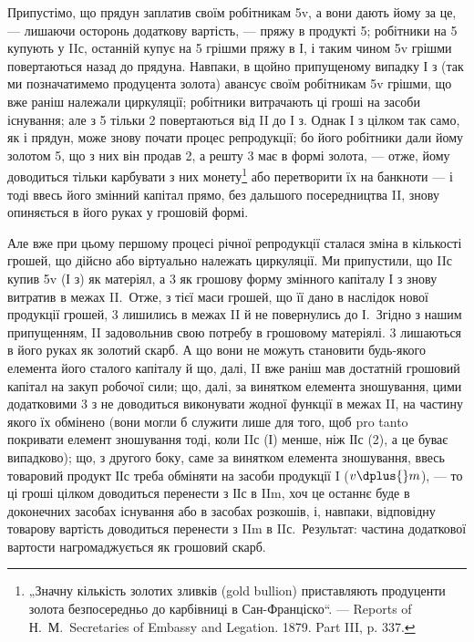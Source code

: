 Припустімо, що прядун заплатив своїм робітникам 5v, а вони дають
йому за це, — лишаючи осторонь додаткову вартість, — пряжу в продукті \deq{} 5;
робітники на 5 купують у IIс, останній купує на 5 грішми пряжу в І, і
таким чином 5v грішми повертаються назад до прядуна. Навпаки, в
щойно припущеному випадку І з (так ми позначатимемо продуцента
золота) авансує своїм робітникам 5v грішми, що вже раніш належали
циркуляції; робітники витрачають ці гроші на засоби існування; але з
5 тільки 2 повертаються від II до І з. Однак І з цілком так само, як і
прядун, може знову почати процес репродукції; бо його робітники дали
йому золотом 5, що з них він продав 2, а решту 3 має в формі золота, —
отже, йому доводиться тільки карбувати з них монету\footnote{
„Значну кількість золотих зливків (gold bullion) приставляють продуценти
золота безпосередньо до карбівниці в Сан-Франціско“. — Reports of Н.~М.~Secretaries
of Embassy and Legation. 1879. Part III, p. 337.
} або перетворити
їх на банкноти — і тоді ввесь його змінний капітал прямо, без
дальшого посередництва II, знову опиняється в його руках у грошовій
формі.

Але вже при цьому першому процесі річної репродукції сталася зміна
в кількості грошей, що дійсно або віртуально належать циркуляції. Ми
припустили, що IIс купив 5v (І з) як матеріял, а 3 як грошову форму
змінного капіталу І з знову витратив в межах II.~Отже, з тієї маси грошей,
що її дано в наслідок нової продукції грошей, 3 лишились в межах
II й не повернулись до І.~Згідно з нашим припущенням, II задовольнив
свою потребу в грошовому матеріялі. 3 лишаються в його руках як
золотий скарб. А що вони не можуть становити будь-якого елемента
його сталого капіталу й що, далі, II вже раніш мав достатній грошовий
капітал на закуп робочої сили; що, далі, за винятком елемента зношування,
цими додатковими 3 з не доводиться виконувати жодної функції в межах II,
на частину якого їх обмінено (вони могли б служити лише для того,
щоб pro tanto покривати елемент зношування тоді, коли IIс (І) менше,
ніж ІІс (2), а це буває випадково); що, з другого боку, саме за винятком
елемента зношування, ввесь товаровий продукт ІІс треба обміняти на
засоби продукції I ($v \dplus{} m$), — то ці гроші цілком доводиться перенести
з ІІс в IIm, хоч це останнє буде в доконечних засобах існування або в
засобах розкошів, і, навпаки, відповідну товарову вартість доводиться
перенести з IIm в IIс.~Результат: частина додаткової вартости нагромаджується
як грошовий скарб.

